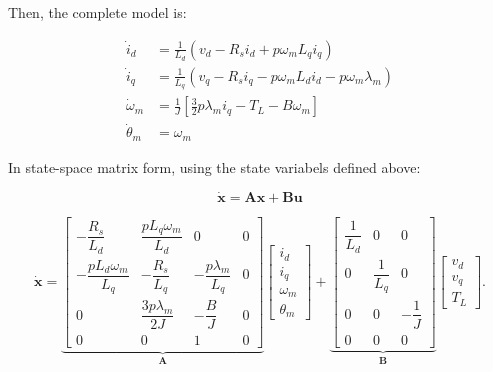\documentclass{article}
\begin{document}
Then, the complete model is:

\begin{align}
    \dot{i}_d &= \frac{1}{L_d}(v_d - R_si_d + p\omega_mL_qi_q) \\[4pt]
    \dot{i}_q &= \frac{1}{L_q}(v_q - R_si_q - p\omega_mL_di_d - p\omega_m\lambda_m) \\[4pt]
    \dot{\omega}_m &= \frac{1}{J}\left[ \frac{3}{2}p\lambda_mi_q - T_L - B\omega_m\right] \\[4pt]
    \dot{\theta}_m &= \omega_m
\end{align}

In state-space matrix form, using the state variabels defined above:

\begin{equation}
    \mathbf{\mathbf{\dot{x}}} = \mathbf{Ax} + \mathbf{Bu}
\end{equation}

\begin{equation}
    \dot{\mathbf{x}}
    =
    \underbrace{
    \begin{bmatrix}
        -\dfrac{R_s}{L_d}
        & \dfrac{pL_q\omega_m}{L_d}
        & 0 & 0 \\[6pt]
        -\dfrac{pL_d\omega_m}{L_q}
        & -\dfrac{R_s}{L_q}
        & -\dfrac{p\lambda_m}{L_q}
        & 0 \\[6pt]
        0
        & \dfrac{3p\lambda_m}{2J}
        & -\dfrac{B}{J}
        & 0 \\[6pt]
        0 & 0 & 1 & 0
    \end{bmatrix}
    }_{\mathbf{A}}
    \begin{bmatrix}
        i_d \\ i_q \\ \omega_m \\ \theta_m
    \end{bmatrix}
    +
    \underbrace{
    \begin{bmatrix}
        \dfrac{1}{L_d} & 0 & 0 \\[6pt]
        0 & \dfrac{1}{L_q} & 0 \\[6pt]
        0 & 0 & -\dfrac{1}{J} \\[6pt]
        0 & 0 & 0
    \end{bmatrix}
    }_{\mathbf{B}}
    \begin{bmatrix}
        v_d \\ v_q \\ T_L
    \end{bmatrix}.
    \label{eq:pmsm-state-space}
\end{equation}
\end{document}
